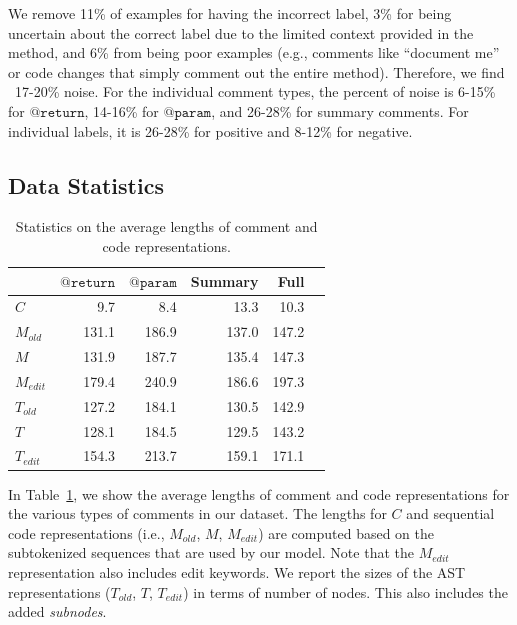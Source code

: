 \documentclass[letterpaper]{article} %
\makeatletter
\newcommand{\CodeIn}[1]{{\ifmmode{\mathtt{#1}}\else$\mathtt{#1}$\fi}}
\newcommand{\Return}{\CodeIn{@return}}
\newcommand{\Param}{\CodeIn{@param}}
\newcommand{\Comment}{$C$}
\newcommand{\OldCode}{$M_{old}$}
\newcommand{\NewCode}{$M$}
\newcommand{\EditCode}{$M_{edit}$}
\newcommand{\NewTree}{$T$}
\newcommand{\OldTree}{$T_{old}$}
\newcommand{\EditTree}{$T_{edit}$}
\makeatother
\begin{document}
We remove 11\% of examples for having the incorrect label, 3\% for being uncertain about the correct label due to the limited context provided in the method, and 6\% from being poor examples (e.g., comments like ``document me'' or code changes that simply comment out the entire method). Therefore, we find ~17-20\% noise. For the individual comment types, the percent of noise is 6-15\% for \Return{}, 14-16\% for \Param{}, and 26-28\% for summary comments. For individual labels, it is 26-28\% for positive and 8-12\% for negative.


\subsection{Data Statistics}

\begin{table}
\centering
\small
\begin{tabular}{l@{\hskip 3mm}rrrrr}
\hline
& \Return{} & \Param{} & Summary & Full \\ 
\hline
\bf \Comment{} & 9.7 & 8.4 & 13.3 & 10.3\\
\bf \OldCode{} & 131.1 & 186.9 & 137.0 & 147.2\\
\bf \NewCode{} & 131.9 & 187.7 & 135.4 & 147.3\\
\bf \EditCode{} & 179.4 & 240.9 & 186.6 & 197.3\\
\bf \OldTree{} & 127.2 & 184.1 & 130.5 & 142.9 \\
\bf \NewTree{} & 128.1 & 184.5 & 129.5 & 143.2 \\
\bf \EditTree{} & 154.3 & 213.7 & 159.1 & 171.1 \\

\hline
\end{tabular}
\vspace{-5pt}
\caption{\label{table:data-stats} Statistics on the average lengths of comment and code representations.}
\end{table}

In Table~\ref{table:data-stats}, we show the average lengths of comment and code representations for the various types of comments in our dataset. The lengths for \Comment{} and sequential code representations (i.e., \OldCode{}, \NewCode{}, \EditCode{}) are computed based on the subtokenized sequences that are used by our model. Note that the \EditCode{} representation also includes edit keywords. We report the sizes of the AST representations (\OldTree{}, \NewTree{}, \EditTree{}) in terms of number of nodes. This also includes the added \textit{subnodes}.
\end{document}
